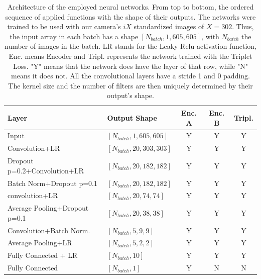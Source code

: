 \documentclass[11pt, a4paper, twoside]{article} %
\begin{document}
\begin{table}[h!]
\caption{Architecture of the employed neural networks. From top to bottom, the ordered sequence of applied functions with the shape of their outputs. The networks were trained to be used with our camera's $iX$ standardized images of $X=302$. Thus, the input array in each batch has a shape $[N_{batch}, 1, 605, 605]$, with $N_{batch}$ the number of images in the batch. LR stands for the Leaky Relu activation function, Enc. means Encoder and Tripl. represents the network trained with the Triplet Loss. "Y" means that the network does have the layer of that row, while "N"  means it does not. All the convolutional layers have a stride 1 and 0 padding. The kernel size and the number of filters are then uniquely determined by their output's shape. \vspace{-0.4cm}}\label{tab:nns}
\center
\begin{tabular}{llccc}
\toprule
                              {\bf Layer} &                 {\bf Output Shape} & {\bf Enc. A} & {\bf Enc. B} & {\bf Tripl.} \\
\midrule
                              Input &   $[N_{batch}, 1, 605, 605]$ &         Y &         Y &                Y \\
                     Convolution+LR &  $[N_{batch}, 20, 303, 303]$ &         Y &         Y &                Y \\
       Dropout p=0.2+Convolution+LR &  $[N_{batch}, 20, 182, 182]$ &         Y &         Y &                Y \\
           Batch Norm+Dropout p=0.1 &  $[N_{batch}, 20, 182, 182]$ &         Y &         Y &                Y \\
                     convolution+LR &    $[N_{batch}, 20, 74, 74]$ &         Y &         Y &                Y \\
      Average Pooling+Dropout p=0.1 &    $[N_{batch}, 20, 38, 38]$ &         Y &         Y &                Y \\
           Convolution+Batch Norm.  &       $[N_{batch}, 5, 9, 9]$ &         Y &         Y &                Y \\
                 Average Pooling+LR &       $[N_{batch}, 5, 2, 2]$ &         Y &         Y &                Y \\
               Fully Connected + LR &            $[N_{batch}, 10]$ &         Y &         Y &                Y \\
                   Fully Connected  &             $[N_{batch}, 1]$ &         Y &         N &                N \\

\end{tabular}
\end{table}
\end{document}
